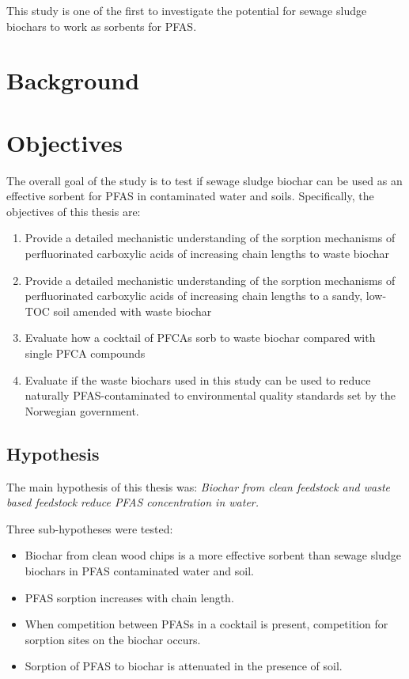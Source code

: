 This study is one of the first to investigate the potential for sewage sludge biochars to work as sorbents for PFAS. 

\section{Background}\label{sec:Background}
 

\section{Objectives}
The overall goal of the study is to test if sewage sludge biochar can be used as an effective sorbent for PFAS in contaminated water and soils. Specifically, the objectives of this thesis are:
\begin{enumerate}
    \item {Provide a detailed mechanistic understanding of the sorption mechanisms of perfluorinated carboxylic acids of increasing chain lengths to waste biochar}
    \item{Provide a detailed mechanistic understanding of the sorption mechanisms of perfluorinated carboxylic acids of increasing chain lengths to a sandy, low-TOC soil amended with waste biochar}
    \item{Evaluate how a cocktail of PFCAs sorb to waste biochar compared with single PFCA compounds}
    \item{Evaluate if the waste biochars used in this study can be used to reduce naturally PFAS-contaminated to environmental quality standards set by the Norwegian government.}
\end{enumerate}

\subsection{Hypothesis}
The main hypothesis of this thesis was:
\textit{Biochar from clean feedstock and waste based feedstock reduce PFAS concentration in water.}

\textit{}

Three sub-hypotheses were tested:
\begin{itemize}
    \item Biochar from clean wood chips is a more effective sorbent than sewage sludge biochars in PFAS contaminated water and soil.
    \item PFAS sorption increases with chain length.
    \item When competition between PFASs in a cocktail is present, competition for sorption sites on the biochar occurs.
    \item Sorption of PFAS to biochar is attenuated in the presence of soil. 
\end{itemize}
